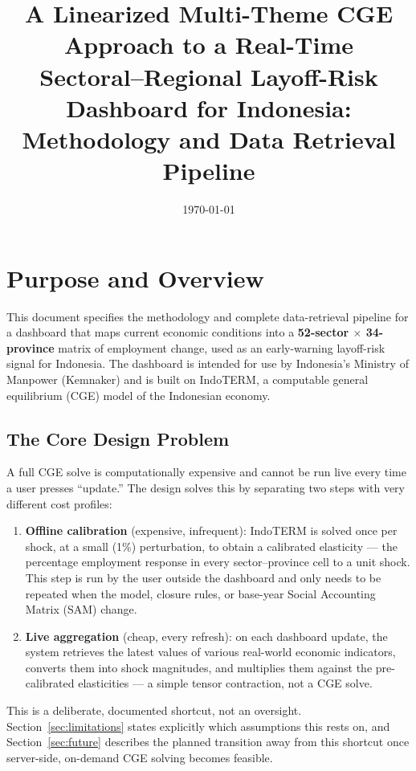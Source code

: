 \documentclass[11pt]{article}
\title{A Linearized Multi-Theme CGE Approach to a Real-Time \\
Sectoral--Regional Layoff-Risk Dashboard for Indonesia: \\
Methodology and Data Retrieval Pipeline}
\author{}
\date{\today}
\begin{document}
\maketitle
\tableofcontents
\newpage

\section{Purpose and Overview}

This document specifies the methodology and complete data-retrieval pipeline
for a dashboard that maps current economic conditions into a
\textbf{52-sector $\times$ 34-province} matrix of employment change, used as
an early-warning layoff-risk signal for Indonesia. The dashboard is intended
for use by Indonesia's Ministry of Manpower (Kemnaker) and is built on
IndoTERM, a computable general equilibrium (CGE) model of the Indonesian
economy.

\subsection{The Core Design Problem}

A full CGE solve is computationally expensive and cannot be run live every
time a user presses ``update.'' The design solves this by separating two
steps with very different cost profiles:

\begin{enumerate}
  \item \textbf{Offline calibration} (expensive, infrequent): IndoTERM is
  solved once per shock, at a small (1\%) perturbation, to obtain a
  calibrated elasticity --- the percentage employment response in every
  sector--province cell to a unit shock. This step is run by the user
  outside the dashboard and only needs to be repeated when the model,
  closure rules, or base-year Social Accounting Matrix (SAM) change.
  \item \textbf{Live aggregation} (cheap, every refresh): on each dashboard
  update, the system retrieves the latest values of various real-world
  economic indicators, converts them into shock magnitudes, and multiplies
  them against the pre-calibrated elasticities --- a simple tensor
  contraction, not a CGE solve.
\end{enumerate}

This is a deliberate, documented shortcut, not an oversight. Section~\ref{sec:limitations}
states explicitly which assumptions this rests on, and Section~\ref{sec:future}
describes the planned transition away from this shortcut once server-side,
on-demand CGE solving becomes feasible.
\end{document}
